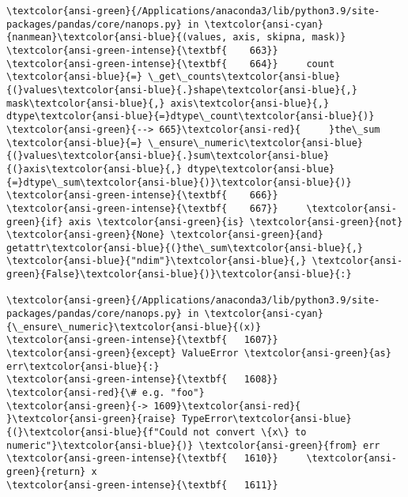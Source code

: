 \documentclass[11pt]{article}
\begin{document}
\begin{Verbatim}[commandchars=\\\{\}, frame=single, framerule=2mm, rulecolor=\color{outerrorbackground}]
\textcolor{ansi-green}{/Applications/anaconda3/lib/python3.9/site-packages/pandas/core/nanops.py} in \textcolor{ansi-cyan}{nanmean}\textcolor{ansi-blue}{(values, axis, skipna, mask)}
\textcolor{ansi-green-intense}{\textbf{    663}} 
\textcolor{ansi-green-intense}{\textbf{    664}}     count \textcolor{ansi-blue}{=} \_get\_counts\textcolor{ansi-blue}{(}values\textcolor{ansi-blue}{.}shape\textcolor{ansi-blue}{,} mask\textcolor{ansi-blue}{,} axis\textcolor{ansi-blue}{,} dtype\textcolor{ansi-blue}{=}dtype\_count\textcolor{ansi-blue}{)}
\textcolor{ansi-green}{--> 665}\textcolor{ansi-red}{     }the\_sum \textcolor{ansi-blue}{=} \_ensure\_numeric\textcolor{ansi-blue}{(}values\textcolor{ansi-blue}{.}sum\textcolor{ansi-blue}{(}axis\textcolor{ansi-blue}{,} dtype\textcolor{ansi-blue}{=}dtype\_sum\textcolor{ansi-blue}{)}\textcolor{ansi-blue}{)}
\textcolor{ansi-green-intense}{\textbf{    666}} 
\textcolor{ansi-green-intense}{\textbf{    667}}     \textcolor{ansi-green}{if} axis \textcolor{ansi-green}{is} \textcolor{ansi-green}{not} \textcolor{ansi-green}{None} \textcolor{ansi-green}{and} getattr\textcolor{ansi-blue}{(}the\_sum\textcolor{ansi-blue}{,} \textcolor{ansi-blue}{"ndim"}\textcolor{ansi-blue}{,} \textcolor{ansi-green}{False}\textcolor{ansi-blue}{)}\textcolor{ansi-blue}{:}

\textcolor{ansi-green}{/Applications/anaconda3/lib/python3.9/site-packages/pandas/core/nanops.py} in \textcolor{ansi-cyan}{\_ensure\_numeric}\textcolor{ansi-blue}{(x)}
\textcolor{ansi-green-intense}{\textbf{   1607}}             \textcolor{ansi-green}{except} ValueError \textcolor{ansi-green}{as} err\textcolor{ansi-blue}{:}
\textcolor{ansi-green-intense}{\textbf{   1608}}                 \textcolor{ansi-red}{\# e.g. "foo"}
\textcolor{ansi-green}{-> 1609}\textcolor{ansi-red}{                 }\textcolor{ansi-green}{raise} TypeError\textcolor{ansi-blue}{(}\textcolor{ansi-blue}{f"Could not convert \{x\} to numeric"}\textcolor{ansi-blue}{)} \textcolor{ansi-green}{from} err
\textcolor{ansi-green-intense}{\textbf{   1610}}     \textcolor{ansi-green}{return} x
\textcolor{ansi-green-intense}{\textbf{   1611}} 


\end{Verbatim}
\end{document}
